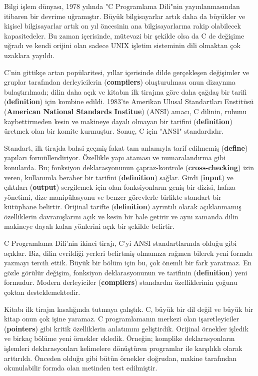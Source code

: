 \documentclass[a4paper,12pt,oneside]{book}
\begin{document}
Bilgi işlem dünyası, 1978 yılında "C Programlama Dili"nin yayınlanmasından itibaren bir devrime uğramıştır. Büyük bilgisayarlar artık daha da büyükler ve kişisel bilgisayarlar artık on yıl öncesinin ana bilgisayarlarına rakip olabilecek kapasitedeler. Bu zaman içerisinde, mütevazi bir şekilde olsa da C de değişime uğradı ve kendi orijini olan sadece UNIX işletim sisteminin dili olmaktan çok uzaklara yayıldı.
\par C'nin gittikçe artan popülaritesi, yıllar içerisinde dilde gerçekleşen değişimler ve gruplar tarafından derleyicilerin (\textbf{compilers}) oluşturulması onun dizaynına bulaştırılmadı; dilin daha açık ve kitabın ilk tirajına göre daha çağdaş bir tarifi (\textbf{definition}) için kombine edildi. 1983'te Amerikan Ulusal Standartları Enstitüsü (\textbf{American National Standards Institue}) (ANSI) amacı, C dilinin, ruhunu kaybettirmeden kesin ve makineye dayalı olmayan bir tarifini (\textbf{definition}) üretmek olan bir komite kurmuştur. Sonuç, C için "ANSI" standardıdır.
\par Standart, ilk tirajda bahsi geçmiş fakat tam anlamıyla tarif edilmemiş (\textbf{define}) yapıları formüllendiriyor. Özellikle yapı ataması ve numaralandırma gibi konularda. Bu; fonksiyon deklarasyonunun çapraz-kontrole (\textbf{cross-checking}) izin veren, kullanımla beraber bir tarifini (\textbf{definition}) sağlar. Girdi (\textbf{input}) ve çıktıları (\textbf{output}) sergilemek için olan fonksiyonların  geniş bir dizisi, hafıza yönetimi, dize manipülasyonu ve benzer görevlerle birlikte standart bir kütüphane belirtir. Orijinal tarifte (\textbf{definition}) ayrıntılı olarak açıklanmamış özelliklerin davranışlarını açık ve kesin bir hale getirir ve aynı zamanda dilin makineye dayalı kalan yönlerini açık bir şekilde belirtir.
\par C Programlama Dili'nin ikinci tirajı, C'yi ANSI standartlarında olduğu gibi açıklar. Biz, dilin evrildiği yerleri belirtmiş olmamıza rağmen bilerek yeni formda yazmayı tercih ettik. Büyük bir bölüm için bu, çok önemli bir fark yaratmaz. En gözle görülür değişim, fonksiyon  deklarasyonunun ve tarifinin (\textbf{definition}) yeni formudur. Modern derleyiciler (\textbf{compilers}) standardın özelliklerinin çoğunu çoktan desteklemektedir.
\par Kitabı ilk tirajın kısalığında tutmaya çalıştık. C, büyük bir dil değil ve büyük bir kitap onun çok işine yaramaz. \pagebreak
C programlamanın merkezi olan işaretleyiciler (\textbf{pointers}) gibi kritik özelliklerin anlatımını geliştirdik.
\thispagestyle{preface} \noindent Orijinal örnekler işledik ve birkaç bölüme yeni örnekler ekledik. Örneğin; komplike deklarasyonların işlemleri deklarasyonları kelimelere dönüştüren programlar ile karşılıklı olarak arttırıldı. Önceden olduğu gibi bütün örnekler doğrudan, makine tarafından okunulabilir formda olan metinden test edilmiştir.
\end{document}
